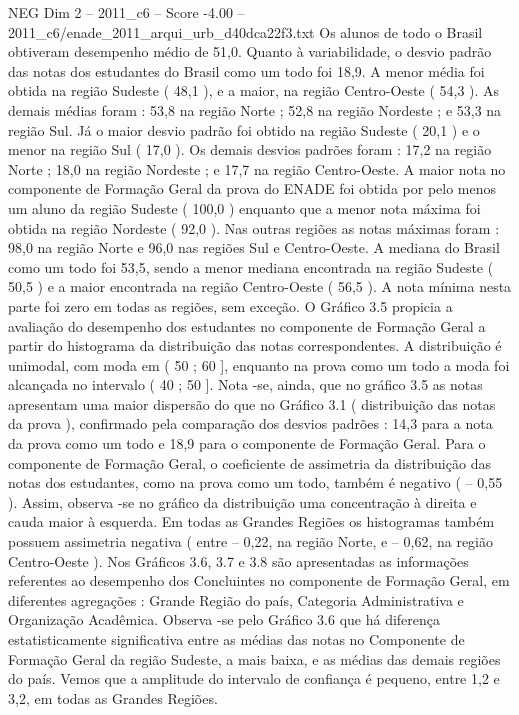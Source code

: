 \begin{textsample}{NEG Dim 2 – 2011\_c6 – Score -4.00 – 2011\_c6/enade\_2011\_arqui\_urb\_d40dca22f3.txt}
Os alunos de todo o Brasil obtiveram desempenho médio de 51,0.
Quanto à variabilidade, o desvio padrão das notas dos estudantes do Brasil como um todo foi 18,9.
A menor média foi obtida na região Sudeste ( 48,1 ), e a maior, na região Centro-Oeste ( 54,3 ).
As demais médias foram : 53,8 na região Norte ; 52,8 na região Nordeste ; e 53,3 na região Sul.
Já o maior desvio padrão foi obtido na região Sudeste ( 20,1 ) e o menor na região Sul ( 17,0 ).
Os demais desvios padrões foram : 17,2 na região Norte ; 18,0 na região Nordeste ; e 17,7 na região Centro-Oeste.
A maior nota no componente de Formação Geral da prova do ENADE foi obtida por pelo menos um aluno da região Sudeste ( 100,0 ) enquanto que a menor nota máxima foi obtida na região Nordeste ( 92,0 ).
Nas outras regiões as notas máximas foram : 98,0 na região Norte e 96,0 nas regiões Sul e Centro-Oeste.
A mediana do Brasil como um todo foi 53,5, sendo a menor mediana encontrada na região Sudeste ( 50,5 ) e a maior encontrada na região Centro-Oeste ( 56,5 ).
A nota mínima nesta parte foi zero em todas as regiões, sem exceção.
O Gráfico 3.5 propicia a avaliação do desempenho dos estudantes no componente de Formação Geral a partir do histograma da distribuição das notas correspondentes.
A distribuição é unimodal, com moda em ( 50 ; 60 ], enquanto na prova como um todo a moda foi alcançada no intervalo ( 40 ; 50 ].
Nota -se, ainda, que no gráfico 3.5 as notas apresentam uma maior dispersão do que no Gráfico 3.1 ( distribuição das notas da prova ), confirmado pela comparação dos desvios padrões : 14,3 para a nota da prova como um todo e 18,9 para o componente de Formação Geral.
Para o componente de Formação Geral, o coeficiente de assimetria da distribuição das notas dos estudantes, como na prova como um todo, também é negativo ( – 0,55 ).
Assim, observa -se no gráfico da distribuição uma concentração à direita e cauda maior à esquerda.
Em todas as Grandes Regiões os histogramas também possuem assimetria negativa ( entre – 0,22, na região Norte, e – 0,62, na região Centro-Oeste ).
Nos Gráficos 3.6, 3.7 e 3.8 são apresentadas as informações referentes ao desempenho dos Concluintes no componente de Formação Geral, em diferentes agregações : Grande Região do país, Categoria Administrativa e Organização Acadêmica.
Observa -se pelo Gráfico 3.6 que há diferença estatisticamente significativa entre as médias das notas no Componente de Formação Geral da região Sudeste, a mais baixa, e as médias das demais regiões do país.
Vemos que a amplitude do intervalo de confiança é pequeno, entre 1,2 e 3,2, em todas as Grandes Regiões.

\end{textsample}
